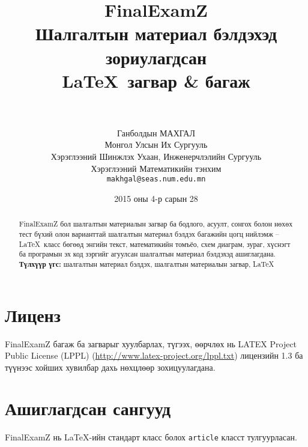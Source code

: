 \documentclass[10pt]{article}
\theoremstyle{definition}
\begin{document}
\title{
  {\Huge FinalExamZ} \\[2mm] Шалгалтын материал бэлдэхэд зориулагдсан \\ \LaTeX\, загвар \& багаж \\[2mm] \large\version \\[2mm] \normalsize \svn}
\author{
  Ганболдын МАХГАЛ\\
  Монгол Улсын Их Сургууль\\
  Хэрэглээний Шинжлэх Ухаан, Инженерчлэлийн Сургууль\\
  Хэрэглээний Математикийн тэнхим\\[2mm]
  \texttt{makhgal@seas.num.edu.mn} \\[2mm]
  \www}
\newcommand{\version}{v1.4.0 -- 2016/12/24}
\newcommand{\www}{\url{http://www.galaa.mn/}}
\newcommand{\svn}{\url{https://github.com/galaamn/FinalExamZ}}
\date{2015 оны 4-р сарын 28} %
\maketitle

\begin{abstract}
FinalExamZ бол шалгалтын материалын загвар ба бодлого, асуулт, сонгох болон нөхөх тест бүхий олон варианттай шалгалтын материал бэлдэх багажийн цогц нийлэмж -- \LaTeX\, класс бөгөөд энгийн текст, математикийн томъёо, схем диаграм, зураг, хүснэгт ба програмын эх код зэргийг агуулсан шалгалтын материал бэлдэхэд ашиглагдана.\\[2mm]
\textbf{Түлхүүр үгс:} шалгалтын материал бэлдэх, шалгалтын материалын загвар, \LaTeX
\end{abstract}

\tableofcontents

\section{Лиценз}\label{license}

FinalExamZ багаж ба загварыг хуулбарлах, түгээх, өөрчлөх нь LATEX Project Public License (LPPL) (\url{http://www.latex-project.org/lppl.txt}) лицензийн 1.3 ба түүнээс хойших хувилбар дахь нөхцлөөр зохицуулагдана.

\section{Ашиглагдсан сангууд}

FinalExamZ нь \LaTeX-ийн стандарт класс болох \texttt{article} класст тулгуурласан.
\end{document}
